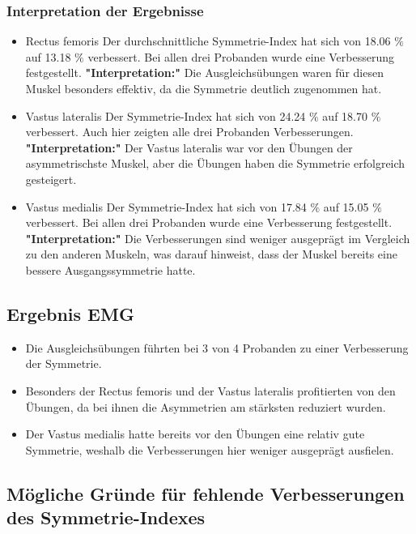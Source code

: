 \subsubsection{Interpretation der Ergebnisse}
\begin{itemize}
    \item Rectus femoris
    Der durchschnittliche Symmetrie-Index hat sich von 18.06 $\%$ auf 13.18 $\%$ verbessert.
    Bei allen drei Probanden wurde eine Verbesserung festgestellt.
    \textbf{"Interpretation:"} Die Ausgleichsübungen waren für diesen Muskel besonders effektiv, da die Symmetrie deutlich zugenommen hat.
    \item Vastus lateralis
    Der Symmetrie-Index hat sich von 24.24 $\%$ auf 18.70 $\%$ verbessert.
    Auch hier zeigten alle drei Probanden Verbesserungen.
    \textbf{"Interpretation:"} Der Vastus lateralis war vor den Übungen der asymmetrischste Muskel, aber die Übungen haben die Symmetrie erfolgreich gesteigert.
    \item Vastus medialis
    Der Symmetrie-Index hat sich von 17.84 $\%$ auf 15.05 $\%$ verbessert.
    Bei allen drei Probanden wurde eine Verbesserung festgestellt.
    \textbf{"Interpretation:"} Die Verbesserungen sind weniger ausgeprägt im Vergleich zu den anderen Muskeln, was darauf hinweist, dass der Muskel bereits eine bessere Ausgangssymmetrie hatte.
\end{itemize}

\subsection{Ergebnis EMG}
\begin{itemize}
    \item Die Ausgleichsübungen führten bei 3 von 4 Probanden zu einer Verbesserung der Symmetrie.
    \item Besonders der Rectus femoris und der Vastus lateralis profitierten von den Übungen, da bei ihnen die Asymmetrien am stärksten reduziert wurden.
    \item Der Vastus medialis hatte bereits vor den Übungen eine relativ gute Symmetrie, weshalb die Verbesserungen hier weniger ausgeprägt ausfielen.
\end{itemize}

\subsection{Mögliche Gründe für fehlende Verbesserungen des Symmetrie-Indexes}

